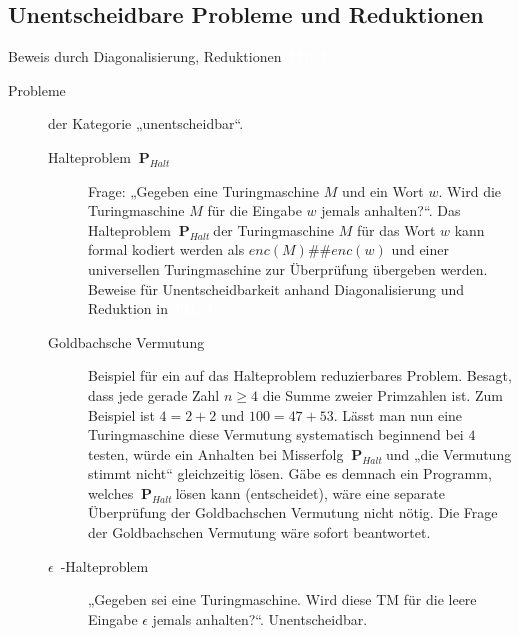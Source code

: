 \documentclass[a4paper,10pt]{article}
\newcommand{\vl}[1]{\colorbox{vl}{\textcolor{white}{\small\textbf{#1}}}}
\newcommand{\prob}[1]{\textbf{#1}}
\newcommand{\phalt}{$~\prob{P}_{Halt}~$}
\begin{document}
    \subsection{Unentscheidbare Probleme und Reduktionen}
    Beweis durch Diagonalisierung, Reduktionen \vl{TIL 4}
    \begin{description}
        \item[Probleme] der Kategorie „unentscheidbar“.
        \begin{description}
            \item[Halteproblem \phalt] Frage: „Gegeben eine Turingmaschine $M$ und ein Wort $w$. Wird die Turingmaschine $M$ für die Eingabe $w$ jemals anhalten?“. Das Halteproblem \phalt der Turingmaschine $M$ für das Wort $w$ kann formal kodiert werden als $enc(M)\#\#enc(w)$ und einer universellen Turingmaschine zur Überprüfung übergeben werden. Beweise für Unentscheidbarkeit anhand Diagonalisierung und Reduktion in \vl{TIL 4}

            \item[Goldbachsche Vermutung] Beispiel für ein auf das Halteproblem reduzierbares Problem. Besagt, dass jede gerade Zahl $n \ge 4$ die Summe zweier Primzahlen ist. Zum Beispiel ist $4 = 2 + 2$ und $100 = 47 + 53$. Lässt man nun eine Turingmaschine diese Vermutung systematisch beginnend bei $4$ testen, würde ein Anhalten bei Misserfolg \phalt und „die Vermutung stimmt nicht“ gleichzeitig lösen. Gäbe es demnach ein Programm, welches \phalt lösen kann (entscheidet), wäre eine separate Überprüfung der Goldbachschen Vermutung nicht nötig. Die Frage der Goldbachschen Vermutung wäre sofort beantwortet.

            \item[$\epsilon$~-Halteproblem] „Gegeben sei eine Turingmaschine. Wird diese TM für die leere Eingabe $\epsilon$ jemals anhalten?“. Unentscheidbar.
        \end{description}


\end{description}
\end{document}
